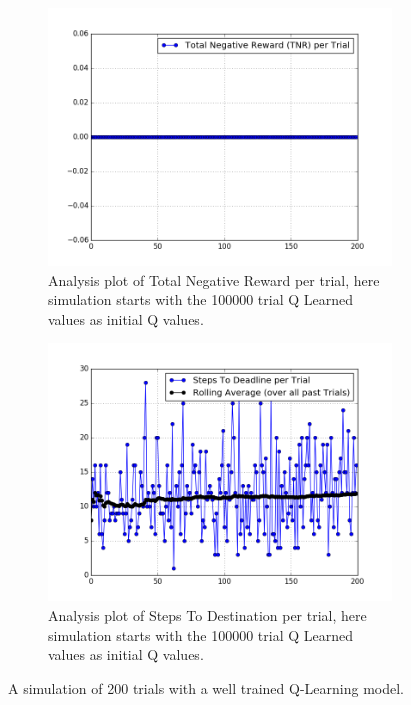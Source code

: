 \documentclass[paper=a4, fontsize=11pt]{scrartcl}
\numberwithin{equation}{section}		%
\numberwithin{figure}{section}			%
\numberwithin{table}{section}				%
\begin{document}
\begin{figure}
	\centering
	\begin{subfigure}{.45\textwidth}
		\centering
		\includegraphics[width= \linewidth]{TNR_100000}
		\caption{Analysis plot of Total Negative Reward per trial, here simulation starts with the 100000 trial Q Learned values as initial Q values.}
		\label{fig:sub1}
	\end{subfigure}%
	\begin{subfigure}{.45\textwidth}
		\centering
		\includegraphics[width= \linewidth]{STD_100000}
		\caption{Analysis plot of Steps To Destination per trial, here simulation starts with the 100000 trial Q Learned values as initial Q values.}
		\label{fig:sub2}
	\end{subfigure}
	\caption{A simulation of 200 trials with a well trained Q-Learning model. }
	\label{fig:test}
\end{figure}
\end{document}
